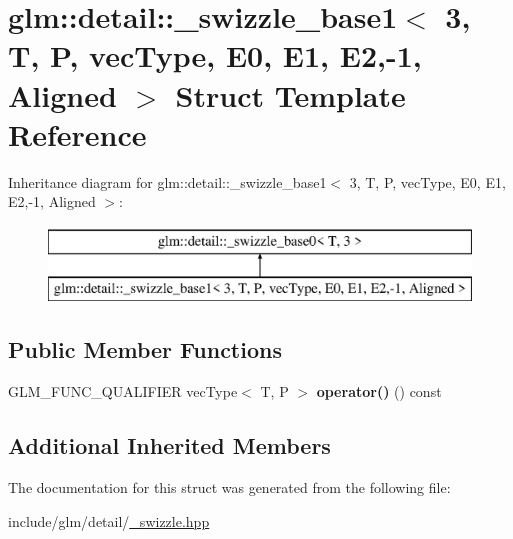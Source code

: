 \hypertarget{structglm_1_1detail_1_1__swizzle__base1_3_013_00_01T_00_01P_00_01vecType_00_01E0_00_01E1_00_01E2_00-1_00_01Aligned_01_4}{}\section{glm\+:\+:detail\+:\+:\+\_\+swizzle\+\_\+base1$<$ 3, T, P, vec\+Type, E0, E1, E2,-\/1, Aligned $>$ Struct Template Reference}
\label{structglm_1_1detail_1_1__swizzle__base1_3_013_00_01T_00_01P_00_01vecType_00_01E0_00_01E1_00_01E2_00-1_00_01Aligned_01_4}
Inheritance diagram for glm\+:\+:detail\+:\+:\+\_\+swizzle\+\_\+base1$<$ 3, T, P, vec\+Type, E0, E1, E2,-\/1, Aligned $>$\+:\begin{figure}[H]
\begin{center}
\leavevmode
\includegraphics[height=2.000000cm]{structglm_1_1detail_1_1__swizzle__base1_3_013_00_01T_00_01P_00_01vecType_00_01E0_00_01E1_00_01E2_00-1_00_01Aligned_01_4}
\end{center}
\end{figure}
\subsection*{Public Member Functions}
\begin{DoxyCompactItemize}
\item 
\mbox{\label{structglm_1_1detail_1_1__swizzle__base1_3_013_00_01T_00_01P_00_01vecType_00_01E0_00_01E1_00_01E2_00-1_00_01Aligned_01_4_a09485ed63b638b9887bd49ba3220ab7b}} 
G\+L\+M\+\_\+\+F\+U\+N\+C\+\_\+\+Q\+U\+A\+L\+I\+F\+I\+ER vec\+Type$<$ T, P $>$ {\bfseries operator()} () const
\end{DoxyCompactItemize}
\subsection*{Additional Inherited Members}


The documentation for this struct was generated from the following file\+:\begin{DoxyCompactItemize}
\item 
include/glm/detail/\hyperlink{__swizzle_8hpp}{\+\_\+swizzle.\+hpp}\end{DoxyCompactItemize}
